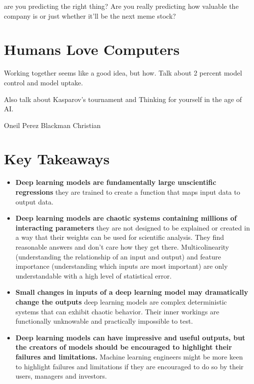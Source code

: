 are you predicting the right thing? Are you really predicting how valuable the company is or just whether it'll be the next meme stock?

\section{Humans Love Computers}

Working together seems like a good idea, but how. Talk about 2 percent model control and model uptake. 

Also talk about Kasparov's tournament and Thinking for yourself in the age of AI. 

Oneil\cite{Oneil2017}
Perez\cite{Perez2019}
Blackman\cite{Blackman2022Jul}
Christian\cite{Christian2020}

\section{Key Takeaways}

\begin{itemize}
    \item \textbf{Deep learning models are fundamentally large unscientific regressions} they are trained to create a function that maps input data to output data.
    \item \textbf{Deep learning models are chaotic systems containing millions of interacting parameters} they are not designed to be explained or created in a way that their weights can be used for scientific analysis. They find reasonable answers and don't care how they get there. Multicolinearity (understanding the relationship of an input and output) and feature importance (understanding which inputs are most important) are only understandable with a high level of statistical error.
    \item \textbf{Small changes in inputs of a deep learning model may dramatically change the outputs} deep learning models are complex deterministic systems that can exhibit chaotic behavior. Their inner workings are functionally unknowable and practically impossible to test.
    \item \textbf{Deep learning models can have impressive and useful outputs, but the creators of models should be encouraged to highlight their failures and limitations.} Machine learning engineers might be more keen to highlight failures and limitations if they are encouraged to do so by their users, managers and investors.
\end{itemize}

